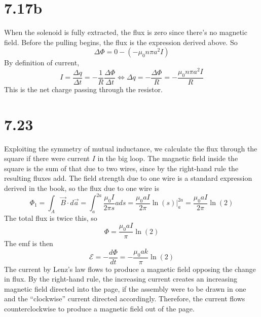 \documentclass{article}
\begin{document}
\section*{7.17b}
When the solenoid is fully extracted, the flux is zero since there's no magnetic field. Before the pulling begins, the flux is the expression derived above. So
\[\Delta \Phi=0-(-\mu_0n\pi a^2I)\]
By definition of current,
\[I=\frac{\Delta q}{\Delta t}=-\frac{1}{R}\frac{\Delta \Phi}{\Delta t}\Leftrightarrow \Delta q=-\frac{\Delta \Phi}{R}=-\frac{\mu_0n\pi a^2I}{R}\]
This is the net charge passing through the resistor.

\section*{7.23}
Exploiting the symmetry of mutual inductance, we calculate the flux through the square if there were current $I$ in the big loop. The magnetic field inside the square is the sum of that due to two wires, since by the right-hand rule the resulting fluxes add. The field strength due to one wire is a standard expression derived in the book, so the flux due to one wire is
\[\Phi_1=\int_A\vec{B}\cdot d\vec{a}=\int_a^{2a}\frac{\mu_0I}{2\pi s}ads=\frac{\mu_0aI}{2\pi}\ln(s)\bigg|_a^{2a}=\frac{\mu_0aI}{2\pi}\ln(2)\]
The total flux is twice this, so
\[\Phi=\frac{\mu_0aI}{\pi}\ln(2)\]
The emf is then
\[\mathcal{E}=-\frac{d\Phi}{dt}=-\frac{\mu_0ak}{\pi}\ln(2)\]
The current by Lenz's law flows to produce a magnetic field opposing the change in flux. By the right-hand rule, the increasing current creates an increasing magnetic field directed into the page, if the assembly were to be drawn in one and the ``clockwise'' current directed accordingly. Therefore, the current flows counterclockwise to produce a magnetic field out of the page.
\end{document}
